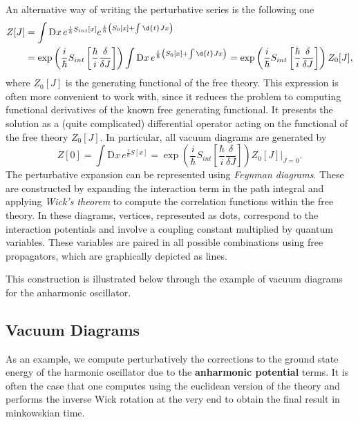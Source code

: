 An alternative way of writing the perturbative series is the following one
\[
    \begin{aligned}
        Z[J] & = \int \mathrm{D}x\, e^{\frac{i}{\hbar}S_{int}[x]}e^{\frac{i}{\hbar}\left(S_{0}[x]+\int \d{t}Jx\right)}                                                                                                                                                                               \\
             & = \exp\left( \frac{i}{\hbar} S_{int}\left[ \frac{\hbar}{i} \frac{\delta}{\delta J} \right] \right) \int \mathrm{D}x\, e^{\frac{i}{\hbar}\left(S_0[x]+\int \d{t}J x\right)} = \exp\left( \frac{i}{\hbar} S_{int}\left[ \frac{\hbar}{i} \frac{\delta}{\delta J} \right] \right) Z_0[J],
    \end{aligned}
\]
where \(Z_0[J]\) is the generating functional of the free theory. This expression is often more convenient to work with, since it reduces the problem to computing functional derivatives of the known free generating functional. It presents the solution as a (quite complicated) differential operator acting on the functional of the free theory \(Z_0[J]\). In particular, all vacuum diagrams are generated by
\[
    Z[0] = \int \mathrm{D}x\, e^{\frac{i}{\hbar}S[x]} = \exp\left( \frac{i}{\hbar} S_{int}\left[ \frac{\hbar}{i} \frac{\delta}{\delta J} \right] \right) Z_0[J] \Big\vert_{J=0}.
\]
The perturbative expansion can be represented using \textit{Feynman diagrams}. These are constructed by expanding the interaction term in the path integral and applying \textit{Wick’s theorem} to compute the correlation functions within the free theory. In these diagrams, vertices, represented as dots, correspond to the interaction potentials and involve a coupling constant multiplied by quantum variables. These variables are paired in all possible combinations using free propagators, which are graphically depicted as lines.

This construction is illustrated below through the example of vacuum diagrams for the anharmonic oscillator.

\subsection{Vacuum Diagrams}

As an example, we compute perturbatively the corrections to the ground state energy of the harmonic oscillator due to the \textbf{anharmonic potential} terms. It is often the case that one computes using the euclidean version of the theory and performs the inverse Wick rotation at the very end to obtain the final result in minkowskian time.

